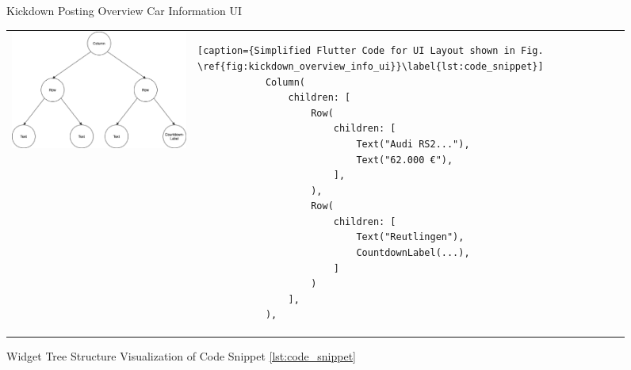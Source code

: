 \begin{figure}
    \centering
    \caption{Kickdown Posting Overview Car Information UI}
    \label{fig:kickdown_overview_info_ui}
\end{figure}

\begin{figure}[htbp]
    \begin{tabular}{p{}p{}}
        \begin{minipage}{.4\textwidth}
        \centering
        \includegraphics[width=\linewidth]{images/Kickdown_overview_info_ui_tree.eps}
        \caption{Widget Tree Structure Visualization of Code Snippet \ref{lst:code_snippet}}
        \label{fig:kickdown_overview_info_ui_tree}
        \end{minipage}
        &
        \begin{minipage}{.6\textwidth}
            \begin{lstlisting}[caption={Simplified Flutter Code for UI Layout shown in Fig. \ref{fig:kickdown_overview_info_ui}}\label{lst:code_snippet}]
            Column(
                children: [
                    Row(
                        children: [
                            Text("Audi RS2..."),
                            Text("62.000 €"),
                        ],
                    ),
                    Row(
                        children: [
                            Text("Reutlingen"),
                            CountdownLabel(...),
                        ]
                    )
                ],
            ),
            \end{lstlisting}
        \end{minipage}
    \end{tabular}
\end{figure}

